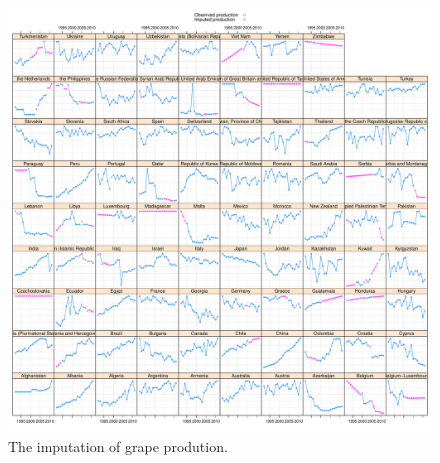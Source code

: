 \documentclass[nojss]{jss}\usepackage[]{graphicx}\usepackage[]{color}
\makeatletter
\def\maxwidth{ %
  \ifdim\Gin@nat@width>\linewidth
    \linewidth
  \else
    \Gin@nat@width
  \fi
}
\newenvironment{knitrout}{}{} %
\makeatother
\begin{document}
\begin{knitrout}
\color{fgcolor}\begin{figure}[!ht]


{\centering \includegraphics[width=\maxwidth]{figure/grape-production-imputed} 

}

\caption[The imputation of grape prodution]{The imputation of grape prodution.\label{fig:grape-production-imputed}}
\end{figure}


\end{knitrout}
\end{document}
